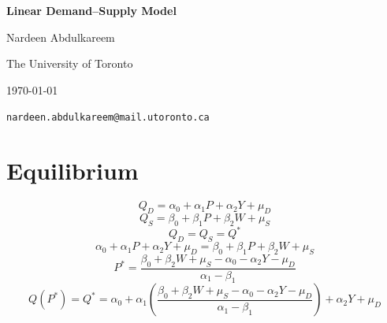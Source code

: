 \documentclass[12pt]{article}
\begin{document}
\begin{titlepage}
    \thispagestyle{empty} %
    \centering
    \vspace*{\fill}

    {\Large \textbf{Linear Demand–Supply Model} \par}

    \vspace{3em}
    {\large Nardeen Abdulkareem \par}
    {\normalsize The University of Toronto \par}
    {\normalsize \today \par}
    {\texttt{nardeen.abdulkareem@mail.utoronto.ca} \par}

    \vspace*{\fill}
\end{titlepage}
\clearpage

\section{Equilibrium}
$$Q_D = \alpha_0 + \alpha_1P + \alpha_2Y + \mu_D$$
$$Q_S = \beta_0 + \beta_1P + \beta_2W + \mu_S$$
$$Q_D = Q_S = Q^*$$
$$\alpha_0 + \alpha_1P + \alpha_2Y + \mu_D = \beta_0 + \beta_1P + \beta_2W + \mu_S$$
$$P^* = \frac{\beta_0 + \beta_2W + \mu_S - \alpha_0 - \alpha_2Y - \mu_D}{\alpha_1 - \beta_1}$$
$$Q(P^*) = Q^* = \alpha_0 + \alpha_1(\frac{\beta_0 + \beta_2W + \mu_S - \alpha_0 - \alpha_2Y - \mu_D}{\alpha_1 - \beta_1}) + \alpha_2Y + \mu_D$$
\end{document}

